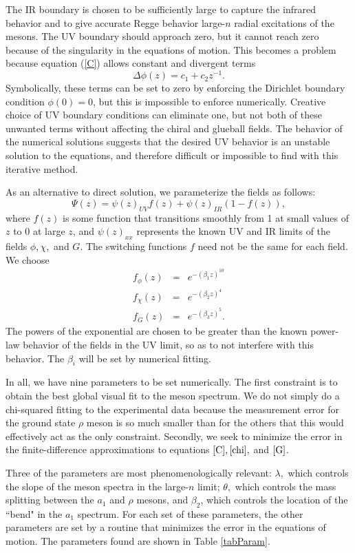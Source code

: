\documentclass[12pt]{article}
\newcommand{\be}{\begin{equation}}
\newcommand{\ee}{\end{equation}}
\newcommand{\ba}{\begin{eqnarray}}
\newcommand{\ea}{\end{eqnarray}}
\begin{document}
The IR boundary is chosen to be sufficiently large to capture the infrared behavior and to give accurate Regge behavior large-$n$ radial excitations of the mesons. 
The UV boundary should approach zero, but it cannot reach zero because of the singularity in the equations of motion. 
This becomes a problem because equation (\ref{C}) allows constant and divergent terms 
\be
\Delta \phi(z) = c_1 + c_2 z^{-1}.
\ee
Symbolically, these terms can be set to zero by enforcing the Dirichlet boundary condition $\phi(0)=0$, but this is impossible to enforce numerically. 
Creative choice of UV boundary conditions can eliminate one, but not both of these unwanted terms without affecting the chiral and glueball fields. 
The behavior of the numerical solutions suggests that the desired UV behavior is an unstable solution to the equations, and therefore difficult or impossible to find with this iterative method.

As an alternative to direct solution, we parameterize the fields as follows:
\be
\Psi(z) = \psi(z)_{UV} f(z) + \psi(z)_{IR} \left(1-f(z)\right),
\ee
where $f(z)$ is some function that transitions smoothly from 1 at small values of $z$ to 0 at large $z$, and $\psi(z)_{xx}$ represents the known UV and IR limits of the fields $\phi, \chi,$ and $G$. 
The switching functions $f$ need not be the same for each field. We choose 
\ba
f_\phi(z)&=&e^{-(\beta_1z)^{10}}\\ \label{param1}
f_\chi(z)&=&e^{-(\beta_2z)^4}\\
f_G(z)&=&e^{-(\beta_3z)^5}. \label{param3}
\ea
The powers of the exponential are chosen to be greater than the known power-law behavior of the fields in the UV limit, so as to not interfere with this behavior. 
The $\beta_i$ will be set by numerical fitting.

In all, we have nine parameters to be set numerically. 
The first constraint is to obtain the best global visual fit to the meson spectrum. 
We do not simply do a chi-squared fitting to the experimental data because the measurement error for the ground state $\rho$ meson is so much smaller than for the others that this would effectively act as the only constraint. 
Secondly, we seek to minimize the error in the finite-difference approximations to equations $\ref{C}, \ref{chi},$ and $\ref{G}$. 

Three of the parameters are most phenomenologically relevant: $\lambda,$ which controls the slope of the meson spectra in the large-$n$ limit; $\theta,$ which controls the mass splitting between the $a_1$ and $\rho$ mesons, and $\beta_2$, which controls the location of the ``bend" in the $a_1$ spectrum.
For each set of these parameters, the other parameters are set by a routine that minimizes the error in the equations of motion. 
The parameters found are shown in Table \ref{tabParam}.
\end{document}
